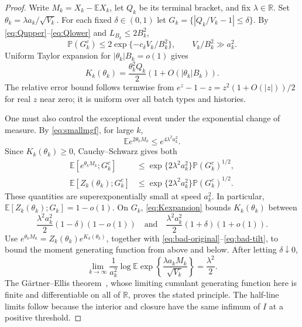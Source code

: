 \documentclass[11pt]{article}
\numberwithin{equation}{section}
\theoremstyle{definition}
\theoremstyle{remark}
\newcommand{\E}{\mathbb E}
\newcommand{\Pp}{\mathbb P}
\newcommand{\R}{\mathbb R}
\begin{document}
\begin{proof}
Write $M_k=X_k-\E X_k$, let $Q_k$ be its terminal bracket, and fix
$\lambda\in\R$. Set $\theta_k=\lambda a_k/\sqrt{V_k}$.
For each fixed $\delta\in(0,1)$ let
$G_k=\{|Q_k/V_k-1|\le\delta\}$. By
\eqref{eq:Qupper}--\eqref{eq:Qlower} and $L_{B_k}\le2B_k^2$,
\begin{equation}\label{eq:superexpbracket}
 \Pp(G_k^c)\le2\exp\{-c_\delta V_k/B_k^2\},
 \qquad V_k/B_k^2\gg a_k^2.
\end{equation}
Uniform Taylor expansion for $|\theta_k|B_k=o(1)$ gives
\begin{equation}\label{eq:Kexpansion}
 K_k(\theta_k)=\frac{\theta_k^2Q_k}{2}
           (1+O(|\theta_k|B_k)).
\end{equation}
The relative error bound follows termwise from
$e^z-1-z=z^2(1+O(|z|))/2$ for real $z$ near zero; it is uniform over
all batch types and histories.

One must also control the exceptional event under the exponential change of
measure. By \eqref{eq:smallmgf}, for large $k$,
\[
 \E e^{2\theta_kM_k}\le e^{4\lambda^2a_k^2}.
\]
Since $K_k(\theta_k)\ge0$, Cauchy--Schwarz gives both
\begin{align}
 \E[e^{\theta_kM_k};G_k^c]
 &\le\exp\{2\lambda^2a_k^2\}\Pp(G_k^c)^{1/2},\label{eq:bad-original}\\
 \E[Z_k(\theta_k);G_k^c]
 &\le\exp\{2\lambda^2a_k^2\}\Pp(G_k^c)^{1/2}.
 \label{eq:bad-tilt}
\end{align}
These quantities are superexponentially small at speed $a_k^2$.
In particular, $\E[Z_k(\theta_k);G_k]=1-o(1)$.
On $G_k$, \eqref{eq:Kexpansion} bounds $K_k(\theta_k)$ between
\[
 \frac{\lambda^2a_k^2}{2}(1-\delta)(1-o(1))
 \quad\text{and}\quad
 \frac{\lambda^2a_k^2}{2}(1+\delta)(1+o(1)).
\]
Use $e^{\theta_kM_k}=Z_k(\theta_k)e^{K_k(\theta_k)}$, together with
\eqref{eq:bad-original}--\eqref{eq:bad-tilt}, to bound the moment generating
function from above and below. After letting $\delta\downarrow0$,
\begin{equation}\label{eq:limitingcgf}
 \lim_{k\to\infty}\frac1{a_k^2}
 \log\E\exp\left\{\frac{\lambda a_kM_k}{\sqrt{V_k}}\right\}
 =\frac{\lambda^2}{2}.
\end{equation}
The G\"artner--Ellis theorem~\cite[Theorem~2.3.6]{DZ}, whose limiting cumulant generating
function here is finite and differentiable on all of $\R$, proves the stated
principle. The half-line limits follow because the interior and closure have
the same infimum of $I$ at a positive threshold.
\end{proof}
\end{document}
